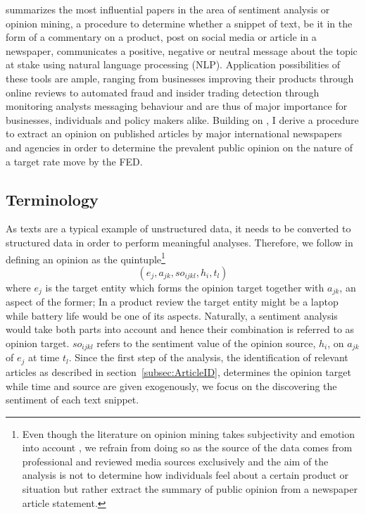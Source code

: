 
\textcite{Liu.2012} summarizes the most influential papers in the area of sentiment analysis or opinion mining, a procedure to determine whether a snippet of text, be it in the form of a commentary on a product, post on social media or article in a newspaper, communicates a positive, negative or neutral message about the topic at stake using natural language processing (NLP). Application possibilities of these tools are ample, ranging from businesses improving their products through online reviews to automated fraud and insider trading detection through monitoring analysts messaging behaviour and are thus of major importance for businesses, individuals and policy makers alike. 
Building on \textcite{Liu.2012,Feldman.2013,Silge.2017,Friedman.2001}, %
I derive a procedure to extract an opinion on published articles by major international newspapers and agencies in order to determine the prevalent public opinion on the nature of a target rate move by the FED.

\subsection{Terminology}

As texts are a typical example of unstructured data, it needs to be converted to structured data in order to perform meaningful analyses. Therefore, we follow \textcite{Liu.2010} in defining an opinion as the quintuple\footnote{Even though the literature on opinion mining takes subjectivity and emotion into account \parencite{Wiebe.2000,Wiebe.2004,Riloff.2006}, we refrain from doing so as the source of the data comes from professional and reviewed media sources exclusively and the aim of the analysis is not to determine how individuals feel about a certain product or situation but rather extract the summary of public opinion from a newspaper article statement.} 
\begin{equation}
	(e_j, a_{jk}, so_{ijkl}, h_i, t_l)
\end{equation}
where $e_j$ is the target entity which forms the opinion target together with $a_{jk}$, an aspect of the former; In a product review the target entity might be a laptop while battery life would be one of its aspects. Naturally, a sentiment analysis would take both parts into account and hence their combination is referred to as opinion target. $so_{ijkl}$ refers to the sentiment value of the opinion source, $h_i$, on $a_{jk}$ of $e_j$ at time $t_l$. 
Since the first step of the analysis, the identification of relevant articles as described in section~\ref{subsec:ArticleID}, determines the opinion target while time and source are given exogenously, we focus on the discovering the sentiment of each text snippet. 


